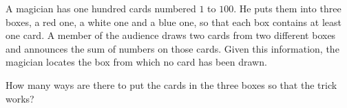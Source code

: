 A magician has one hundred cards numbered $1$ to $100$.
He puts them into three boxes, a red one, a white one and a blue one,
so that each box contains at least one card.
A member of the audience draws two cards from two different boxes
and announces the sum of numbers on those cards.
Given this information,
the magician locates the box from which no card has been drawn.

How many ways are there to put the cards
in the three boxes so that the trick works?